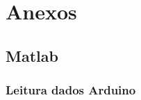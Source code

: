 \documentclass[a4paper,11pt]{article}
\begin{document}
\newpage

\nocite{matlabcontrol}
\nocite{matlabsymbolic}
\nocite{ogata2010modern}
\nocite{nise2012}

\newpage
\section*{Anexos}



\subsection*{Matlab}



\subsubsection*{Leitura dados Arduino}
\inputminted[xleftmargin=15pt,linenos,frame=single,framesep=5pt,breaklines=true]{matlab}{../matlab/plotArduino.m}
\end{document}
